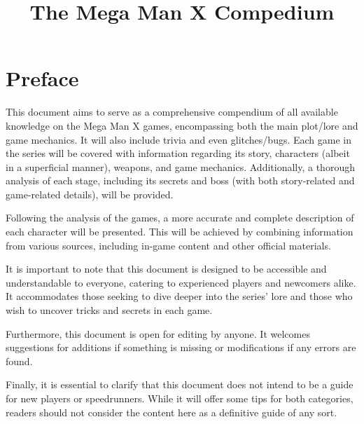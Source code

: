 \documentclass[openany,draft]{report}
\title{The Mega Man X Compedium}
\begin{document}
\begin{titlepage}
	\maketitle
	\thispagestyle{empty}
\end{titlepage}

\tableofcontents
	\section*{Preface}
	This document aims to serve as a comprehensive compendium of all available knowledge on the Mega Man X games, encompassing both the main plot/lore and game mechanics. It will also include trivia and even glitches/bugs. Each game in the series will be covered with information regarding its story, characters (albeit in a superficial manner), weapons, and game mechanics. Additionally, a thorough analysis of each stage, including its secrets and boss (with both story-related and game-related details), will be provided.
	
	Following the analysis of the games, a more accurate and complete description of each character will be presented. This will be achieved by combining information from various sources, including in-game content and other official materials.
	
	It is important to note that this document is designed to be accessible and understandable to everyone, catering to experienced players and newcomers alike. It accommodates those seeking to dive deeper into the series' lore and those who wish to uncover tricks and secrets in each game.
	
	Furthermore, this document is open for editing by anyone. It welcomes suggestions for additions if something is missing or modifications if any errors are found.
	
	Finally, it is essential to clarify that this document does not intend to be a guide for new players or speedrunners. While it will offer some tips for both categories, readers should not consider the content here as a definitive guide of any sort.
	
\end{document}
